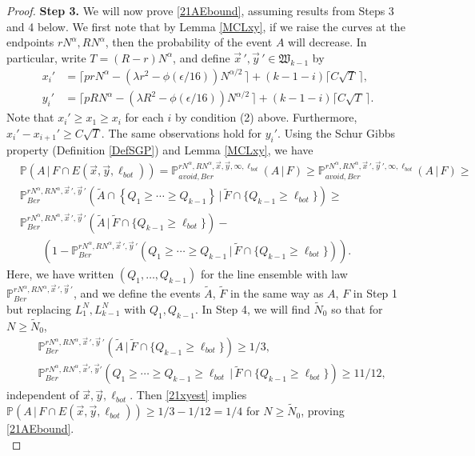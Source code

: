 \begin{proof}
		\noindent\textbf{Step 3.} We will now prove \eqref{21AEbound}, assuming results from Steps 3 and 4 below. We first note that by Lemma \ref{MCLxy}, if we raise the curves at the endpoints $rN^\alpha,RN^\alpha$, then the probability of the event $A$ will decrease. In particular, write $T = (R-r)N^\alpha$, and define $\vec{x}\,',\vec{y}\,'\in\mathfrak{W}_{k-1}$ by
		\begin{align*}
		x_i' &= \lceil prN^\alpha - (\lambda r^2 - \phi(\epsilon/16))N^{\alpha/2}\,\rceil + (k-1-i)\lceil C\sqrt{T}\,\rceil,\\
		y_i' &= \lceil pRN^\alpha - (\lambda R^2 - \phi(\epsilon/16))N^{\alpha/2}\,\rceil + (k-1-i)\lceil C\sqrt{T}\,\rceil.
		\end{align*}
		Note that $x_i' \geq x_1 \geq x_i$ for each $i$ by condition (2) above. Furthermore, $x_i' - x_{i+1}' \geq C\sqrt{T}$. The same observations hold for $y_i'$. Using the Schur Gibbs property (Definition \ref{DefSGP}) and Lemma \ref{MCLxy}, we have
		\begin{equation}\label{21xyest}
		\begin{split}
		&\mathbb{P}(A\,|\,F\cap E(\vec{x},\vec{y},\ell_{bot})) = \mathbb{P}^{rN^\alpha, RN^\alpha,\vec{x},\vec{y},\infty,\ell_{bot}}_{avoid,Ber} (A\,|\,F) \geq \mathbb{P}^{rN^\alpha, RN^\alpha,\vec{x}\,',\vec{y}\,',\infty,\ell_{bot}}_{avoid,Ber} (A\,|\,F) \geq \\
		&\mathbb{P}^{rN^\alpha, RN^\alpha,\vec{x}\,',\vec{y}\,'}_{Ber} \left(\tilde{A}\cap\left\{Q_1 \geq \cdots \geq Q_{k-1}\right\}\,\big|\,\tilde F \cap \{ Q_{k-1} \geq \ell_{bot}\}\right) \geq \\
		&\mathbb{P}^{rN^\alpha, RN^\alpha,\vec{x}\,',\vec{y}\,'}_{Ber} \left(\tilde A\,\big|\,\tilde F \cap \{ Q_{k-1} \geq \ell_{bot}\}\right) -\\
		&\qquad \left( 1 - \mathbb{P}^{rN^\alpha, RN^\alpha,\vec{x}\,',\vec{y}\,'}_{Ber} \left(Q_1 \geq \cdots \geq Q_{k-1}\,\big|\,\tilde F\cap \{ Q_{k-1} \geq \ell_{bot}\}\right)\right). 
		\end{split}
		\end{equation}
		Here, we have written $(Q_1,\dots,Q_{k-1})$ for the line ensemble with law $\mathbb{P}^{rN^\alpha, RN^\alpha,\vec{x}\,',\vec{y}\,'}_{Ber}$, and we define the events $\tilde A$, $\tilde F$ in the same way as $A$, $F$ in Step 1 but replacing $L_1^N, L_{k-1}^N$ with $Q_1, Q_{k-1}$. In Step 4, we will find $\tilde{N}_0$ so that for $N\geq\tilde{N}_0$, 
		\begin{align}
		& \mathbb{P}^{rN^\alpha, RN^\alpha,\vec{x}\,',\vec{y}\,'}_{Ber} \left(\tilde A\,\big|\,\tilde F \cap \{ Q_{k-1} \geq \ell_{bot}\}\right) \geq 1/3, \label{21 1/3}\\
		& \mathbb{P}^{rN^\alpha, RN^\alpha,\vec{x}',\vec{y}'}_{Ber} \left(Q_1 \geq \cdots \geq Q_{k-1} \geq \ell_{bot}\,\big|\,\tilde F\cap \{ Q_{k-1} \geq \ell_{bot}\}\right) \geq 11/12 \label{21 1/12},
		\end{align}
		independent of $\vec{x},\vec{y},\ell_{bot}$. Then \eqref{21xyest} implies $\mathbb{P}(A\,|\,F\cap E(\vec{x},\vec{y},\ell_{bot})) \geq 1/3 - 1/12 = 1/4$ for $N\geq\tilde{N}_0$, proving \eqref{21AEbound}.\\
		

\end{proof}
